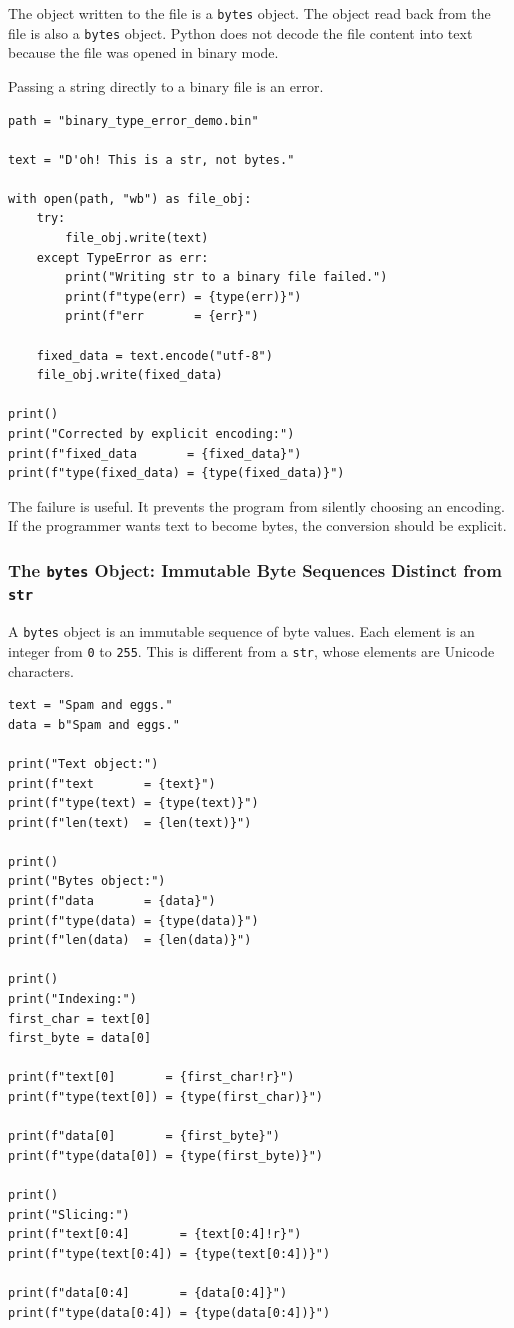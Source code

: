 The object written to the file is a \texttt{bytes} object. The object read back from the file is also a \texttt{bytes} object. Python does not decode the file content into text because the file was opened in binary mode.

Passing a string directly to a binary file is an error.

\begin{verbatim}
path = "binary_type_error_demo.bin"

text = "D'oh! This is a str, not bytes."

with open(path, "wb") as file_obj:
    try:
        file_obj.write(text)
    except TypeError as err:
        print("Writing str to a binary file failed.")
        print(f"type(err) = {type(err)}")
        print(f"err       = {err}")

    fixed_data = text.encode("utf-8")
    file_obj.write(fixed_data)

print()
print("Corrected by explicit encoding:")
print(f"fixed_data       = {fixed_data}")
print(f"type(fixed_data) = {type(fixed_data)}")
\end{verbatim}

The failure is useful. It prevents the program from silently choosing an encoding. If the programmer wants text to become bytes, the conversion should be explicit.

\subsubsection{The \texttt{bytes} Object: Immutable Byte Sequences Distinct from \texttt{str}}

A \texttt{bytes} object is an immutable sequence of byte values. Each element is an integer from \texttt{0} to \texttt{255}. This is different from a \texttt{str}, whose elements are Unicode characters.

\begin{verbatim}
text = "Spam and eggs."
data = b"Spam and eggs."

print("Text object:")
print(f"text       = {text}")
print(f"type(text) = {type(text)}")
print(f"len(text)  = {len(text)}")

print()
print("Bytes object:")
print(f"data       = {data}")
print(f"type(data) = {type(data)}")
print(f"len(data)  = {len(data)}")

print()
print("Indexing:")
first_char = text[0]
first_byte = data[0]

print(f"text[0]       = {first_char!r}")
print(f"type(text[0]) = {type(first_char)}")

print(f"data[0]       = {first_byte}")
print(f"type(data[0]) = {type(first_byte)}")

print()
print("Slicing:")
print(f"text[0:4]       = {text[0:4]!r}")
print(f"type(text[0:4]) = {type(text[0:4])}")

print(f"data[0:4]       = {data[0:4]}")
print(f"type(data[0:4]) = {type(data[0:4])}")
\end{verbatim}

